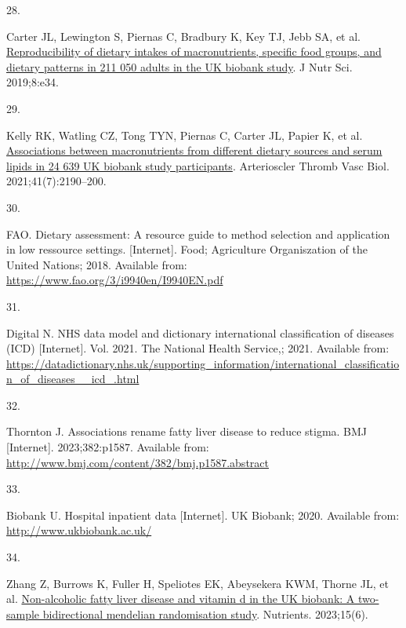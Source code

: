 \documentclass[
  11pt,
  a4paper,
  DIV=11,
  numbers=noendperiod,
  twocolumn]{scrartcl}
\newlength{\cslhangindent}
\newlength{\csllabelwidth}
\newlength{\cslentryspacingunit} %
\newenvironment{CSLReferences}[2] %
 {%
  \setlength{\parindent}{0pt}
  \ifodd #1
  \let\oldpar\par
  \def\par{\hangindent=\cslhangindent\oldpar}
  \fi
  \setlength{\parskip}{#2\cslentryspacingunit}
 }%
 {}
\newcommand{\CSLLeftMargin}[1]{\parbox[t]{\csllabelwidth}{#1}}
\newcommand{\CSLRightInline}[1]{\parbox[t]{\linewidth - \csllabelwidth}{#1}\break}
\begin{document}
\begin{CSLReferences}{0}{0}
\leavevmode{}%
\CSLLeftMargin{28. }%
\CSLRightInline{Carter JL, Lewington S, Piernas C, Bradbury K, Key TJ,
Jebb SA, et al.
\href{https://doi.org/10.1017/jns.2019.31}{Reproducibility of dietary
intakes of macronutrients, specific food groups, and dietary patterns in
211 050 adults in the UK biobank study}. J Nutr Sci. 2019;8:e34. }

\leavevmode{}%
\CSLLeftMargin{29. }%
\CSLRightInline{Kelly RK, Watling CZ, Tong TYN, Piernas C, Carter JL,
Papier K, et al.
\href{https://doi.org/10.1161/atvbaha.120.315628}{Associations between
macronutrients from different dietary sources and serum lipids in 24 639
UK biobank study participants}. Arterioscler Thromb Vasc Biol.
2021;41(7):2190--200. }

\leavevmode{}%
\CSLLeftMargin{30. }%
\CSLRightInline{FAO. Dietary assessment: A resource guide to method
selection and application in low ressource settings. {[}Internet{]}.
Food; Agriculture Organiszation of the United Nations; 2018. Available
from: \url{https://www.fao.org/3/i9940en/I9940EN.pdf}}

\leavevmode{}%
\CSLLeftMargin{31. }%
\CSLRightInline{Digital N. NHS data model and dictionary international
classification of diseases (ICD) {[}Internet{]}. Vol. 2021. The National
Health Service,; 2021. Available from:
\url{https://datadictionary.nhs.uk/supporting_information/international_classification_of_diseases__icd_.html}}

\leavevmode{}%
\CSLLeftMargin{32. }%
\CSLRightInline{Thornton J. Associations rename fatty liver disease to
reduce stigma. BMJ {[}Internet{]}. 2023;382:p1587. Available from:
\url{http://www.bmj.com/content/382/bmj.p1587.abstract}}

\leavevmode{}%
\CSLLeftMargin{33. }%
\CSLRightInline{Biobank U. Hospital inpatient data {[}Internet{]}. UK
Biobank; 2020. Available from: \url{http://www.ukbiobank.ac.uk/}}

\leavevmode{}%
\CSLLeftMargin{34. }%
\CSLRightInline{Zhang Z, Burrows K, Fuller H, Speliotes EK, Abeysekera
KWM, Thorne JL, et al.
\href{https://doi.org/10.3390/nu15061442}{Non-alcoholic fatty liver
disease and vitamin d in the UK biobank: A two-sample bidirectional
mendelian randomisation study}. Nutrients. 2023;15(6). }


\end{CSLReferences}
\end{document}
